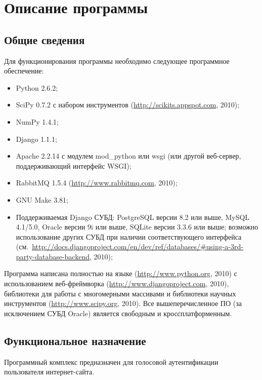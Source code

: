\section{Описание программы}
\subsection{Общие сведения}
\label{sec:soft_description:general}

Для функционирования программы необходимо следующее программное обеспечение:
\begin{itemize}
\item Python 2.6.2;
\item SciPy 0.7.2 с набором инструментов  (\url{http://scikits.appspot.com}, 2010);
\item NumPy 1.4.1;
\item Django 1.1.1;
\item Apache 2.2.14 с модулем mod\_python или wsgi (или другой веб-сервер,
поддерживающий интерфейс WSGI);
\item RabbitMQ 1.5.4 (\url{http://www.rabbitmq.com}, 2010);
\item GNU Make 3.81;
\item Поддерживаемая Django СУБД: PostgreSQL версии 8.2 или выше, MySQL 4.1/5.0, Oracle версии 9i или выше, SQLite версии 3.3.6 или выше; возможно использование других СУБД при наличии соответствующего интерфейса (см.~\url{http://docs.djangoproject.com/en/dev/ref/databases/#using-a-3rd-party-database-backend}, 2010);
\end{itemize}

Программа написана полностью на языке  (\url{http://www.python.org}, 2010) с использованием веб-фреймворка  (\url{http://www.djangoproject.com}, 2010), библиотеки для работы с многомерными массивами  и библиотеки научных инструментов  (\url{http://www.scipy.org}, 2010). Все вышеперечисленное ПО (за исключением СУБД Oracle) является свободным и кроссплатформенным.

\subsection{Функциональное назначение}

Программный комплекс предназначен для голосовой аутентификации пользователя
интернет-сайта.


